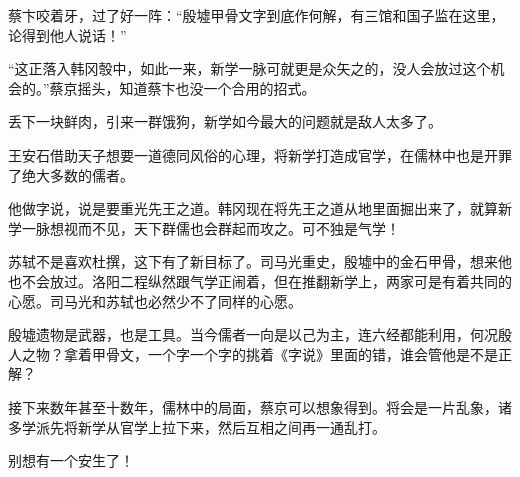 蔡卞咬着牙，过了好一阵：“殷墟甲骨文字到底作何解，有三馆和国子监在这里，论得到他人说话！”

“这正落入韩冈彀中，如此一来，新学一脉可就更是众矢之的，没人会放过这个机会的。”蔡京摇头，知道蔡卞也没一个合用的招式。

丢下一块鲜肉，引来一群饿狗，新学如今最大的问题就是敌人太多了。

王安石借助天子想要一道德同风俗的心理，将新学打造成官学，在儒林中也是开罪了绝大多数的儒者。

他做字说，说是要重光先王之道。韩冈现在将先王之道从地里面掘出来了，就算新学一脉想视而不见，天下群儒也会群起而攻之。可不独是气学！

苏轼不是喜欢杜撰，这下有了新目标了。司马光重史，殷墟中的金石甲骨，想来他也不会放过。洛阳二程纵然跟气学正闹着，但在推翻新学上，两家可是有着共同的心愿。司马光和苏轼也必然少不了同样的心愿。

殷墟遗物是武器，也是工具。当今儒者一向是以己为主，连六经都能利用，何况殷人之物？拿着甲骨文，一个字一个字的挑着《字说》里面的错，谁会管他是不是正解？

接下来数年甚至十数年，儒林中的局面，蔡京可以想象得到。将会是一片乱象，诸多学派先将新学从官学上拉下来，然后互相之间再一通乱打。

别想有一个安生了！


